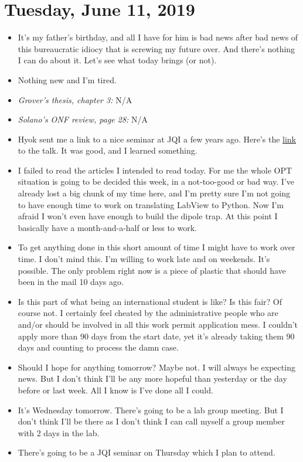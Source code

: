 \documentclass{report}
\theoremstyle{definition}
\begin{document}
\section{Tuesday, June 11, 2019}

\begin{itemize}
	\item It's my father's birthday, and all I have for him is bad news after bad news of this bureaucratic idiocy that is screwing my future over. And there's nothing I can do about it. Let's see what today brings (or not).
	
	\item Nothing new and I'm tired. 
	
	
	\item \textit{Grover's thesis, chapter 3:} N/A
	
	
	\item \textit{Solano's ONF review, page 28:} N/A
	
	\item Hyok sent me a link to a nice seminar at JQI a few years ago. Here's the \href{https://www.youtube.com/watch?v=IFsB554TCZY}{link} to the talk. It was good, and I learned something.
	
	\item I failed to read the articles I intended to read today. For me the whole OPT situation is going to be decided this week, in a not-too-good or bad way. I've already lost a big chunk of my time here, and I'm pretty sure I'm not going to have enough time to work on translating LabView to Python. Now I'm afraid I won't even have enough to build the dipole trap. At this point I basically have a month-and-a-half or less to work. 
	
	\item To get anything done in this short amount of time I might have to work over time. I don't mind this. I'm willing to work late and on weekends. It's possible. The only problem right now is a piece of plastic that should have been in the mail 10 days ago.
	
	\item Is this part of what being an international student is like? Is this fair? Of course not. I certainly feel cheated by the administrative people who are and/or should be involved in all this work permit application mess. I couldn't apply more than 90 days from the start date, yet it's already taking them 90 days and counting to process the damn case. 
	
	\item Should I hope for anything tomorrow? Maybe not. I will always be expecting news. But I don't think I'll be any more hopeful than yesterday or the day before or last week. All I know is I've done all I could.
	
	\item It's Wednesday tomorrow. There's going to be a lab group meeting. But I don't think I'll be there as I don't think I can call myself a group member with 2 days in the lab.
	
	\item There's going to be a JQI seminar on Thursday which I plan to attend. 
	
	
\end{itemize}
\end{document}
